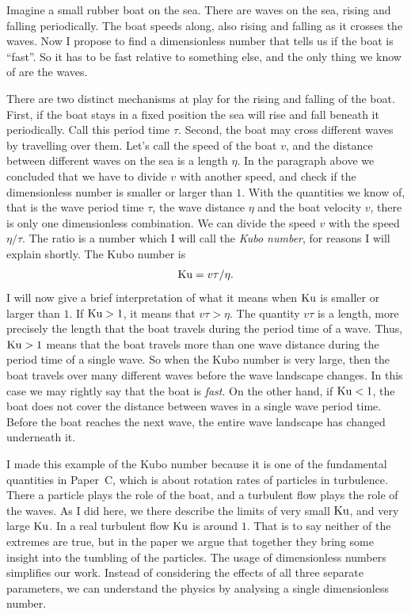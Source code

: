 \documentclass[thesis.tex]{subfiles}
\begin{document}
Imagine a small rubber boat on the sea. There are waves on the sea, rising and falling periodically.  The boat speeds along, also rising and falling as it crosses the waves. Now I propose to find a dimensionless number that tells us if the boat is ``fast''. So it has to be fast relative to something else, and the only thing we know of are the waves. 

There are two distinct mechanisms at play for the rising and falling of the boat. First, if the boat stays in a fixed position the sea will rise and fall beneath it periodically. Call this period time $\tau$. Second, the boat may cross different waves by travelling over them. Let's call the speed of the boat $v$, and the distance between different waves on the sea is a length $\eta$. In the paragraph above we concluded that we have to divide $v$ with another speed, and check if the dimensionless number is smaller or larger than $1$. With the quantities we know of, that is the wave period time $\tau$, the wave distance $\eta$ and the boat velocity $v$, there is only one dimensionless combination. We can divide the speed $v$ with the speed $\eta/\tau$. The ratio is a number which I will call the \emph{Kubo number}, for reasons I will explain shortly. The Kubo number is
\begin{align*}
\mbox{Ku} = v\tau/\eta.
\end{align*}
I will now give a brief interpretation of what it means when $\mbox{Ku}$ is smaller or larger than $1$. If $\mbox{Ku} > 1$, it means that $v\tau > \eta$. The quantity $v\tau$ is a length, more precisely the length that the boat travels during the period time of a wave. Thus, $\mbox{Ku} > 1$ means that the boat travels more than one wave distance during the period time of a single wave. So when the Kubo number is very large, then the boat travels over many different waves before the wave landscape changes. In this case we may rightly say that the boat is \emph{fast}. On the other hand, if $\mbox{Ku}<1$, the boat does not cover the distance between waves in a single wave period time. Before the boat reaches the next wave, the entire wave landscape has changed underneath it.

I made this example of the Kubo number because it is one of the fundamental quantities in Paper~C, which is about rotation rates of particles in turbulence. There a particle plays the role of the boat, and a turbulent flow plays the role of the waves. As I did here, we there describe the limits of very small $\mbox{Ku}$, and very large $\mbox{Ku}$. In a real turbulent flow $\mbox{Ku}$ is around $1$. That is to say neither of the extremes are true, but in the paper we argue that together they bring some insight into the tumbling of the particles. The usage of dimensionless numbers simplifies our work. Instead of considering the effects of all three separate parameters, we can understand the physics by analysing a single dimensionless number.
\end{document}
